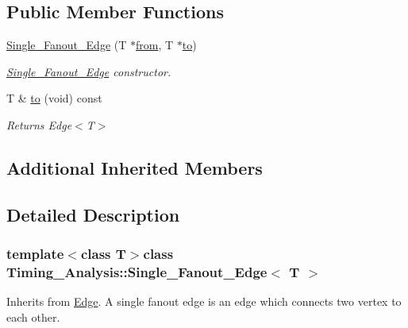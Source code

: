 \subsection*{Public Member Functions}
\begin{DoxyCompactItemize}
\item 
\hyperlink{classTiming__Analysis_1_1Single__Fanout__Edge_ac588152ff213288a57a744374039790a}{Single\-\_\-\-Fanout\-\_\-\-Edge} (T $\ast$\hyperlink{classTiming__Analysis_1_1Edge_a47020ea89fd9fde438adc814a731a23d}{from}, T $\ast$\hyperlink{classTiming__Analysis_1_1Single__Fanout__Edge_ac01deccce158b6cee6883924e6dcb788}{to})
\begin{DoxyCompactList}\small\item\em \hyperlink{classTiming__Analysis_1_1Single__Fanout__Edge}{Single\-\_\-\-Fanout\-\_\-\-Edge} constructor. \end{DoxyCompactList}\item 
T \& \hyperlink{classTiming__Analysis_1_1Single__Fanout__Edge_ac01deccce158b6cee6883924e6dcb788}{to} (void) const 
\begin{DoxyCompactList}\small\item\em Returns Edge$<$\-T$>$ \end{DoxyCompactList}\end{DoxyCompactItemize}
\subsection*{Additional Inherited Members}


\subsection{Detailed Description}
\subsubsection*{template$<$class T$>$class Timing\-\_\-\-Analysis\-::\-Single\-\_\-\-Fanout\-\_\-\-Edge$<$ T $>$}

Inherits from \hyperlink{classTiming__Analysis_1_1Edge}{Edge}. A single fanout edge is an edge which connects two vertex to each other. 



